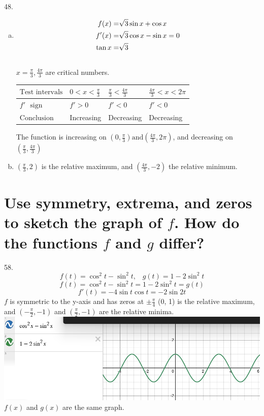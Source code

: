 \documentclass[11pt]{article}
\newcommand*{\set}{\setcounter{equation}{0}}
\begin{document}
48.\begin{enumerate}[(a)]
    \item \begin{align}
        \set
        f(x)&=\sqrt[]{3}\sin x+\cos x\\
        f'(x)&=\sqrt[]{3}\cos x-\sin x=0\\
        \tan x&=\sqrt[]{3}
    \end{align}\\
    $x=\frac{\pi}{3}, \frac{4\pi}{3}$ are critical numbers.
    \begin{flushleft}
        \begin{table}[h]
                \begin{tabular}{|l|l|l|l|}
                    \hline
                    $\text{Test intervals}$ & $0<x<\frac{\pi}{3}$ & $\frac{\pi}{3}<\frac{4\pi}{3}$ & $\frac{4\pi}{3}<x<2\pi$\\ \hline
                    $f'\,\,\,\,\text{sign}$ & $f'>0$ & $f'<0$ & $f'<0$\\ \hline
                    $\text{Conclusion}$ & Increasing & Decreasing & Decreasing\\
                    \hline
             \end{tabular}
            \end{table}
        \end{flushleft}
        The function is increasing on $\left(0, \frac{\pi}{3}\right) \text{and} \left(\frac{4\pi}{3}, 2\pi\right)$, and decreasing on $\left(\frac{\pi}{3}, \frac{4\pi}{3}\right)$
        \item $\left(\frac{\pi}{3}, 2\right)$ is the relative maximum, and $\left(\frac{4\pi}{3}, -2\right)$ the relative minimum.
\end{enumerate}

\section{Use symmetry, extrema, and zeros to sketch the graph of $f$. How do the functions $f$ and $g$ differ?}
58.\[f(t)=\cos^2t-\sin^2t,\,\,\,\,\, g(t)=1-2\sin^2t\]
\[f(t)=\cos^2t-\sin^2t=1-2\sin^2 t=g(t)\]
\[f'(t)=-4\sin t\cos t=-2\sin 2t\]
$f$ is symmetric to the y-axis and has zeros at $\pm \frac{\pi}{4}$
(0, 1) is the relative maximum, and $\left(-\frac{\pi}{2}, -1\right)$ and $\left(\frac{\pi}{2}, -1\right)$ are the relative minima.\\
\includegraphics{58.png}\\
$f(x)$ and $g(x)$ are the same graph.
\end{document}
